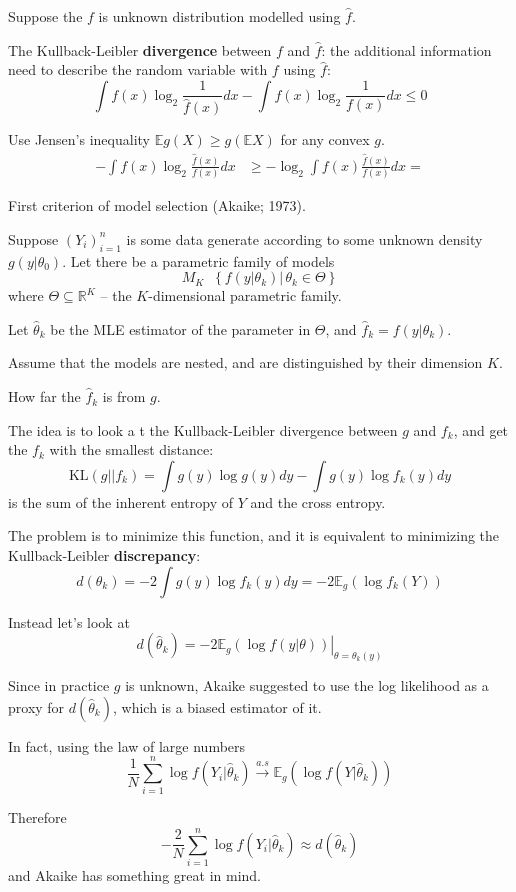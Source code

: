 \documentclass[a4paper]{article}
\newcommand{\obj}[1]{{\left\{ #1 \right \}}}
\newcommand{\brac}[1]{{\left ( #1 \right )}}
\newcommand{\induc}[1]{{\left . #1 \right \vert}}
\newcommand{\Real}{\mathbb{R}}
\newcommand{\Ex}[0]{{\mathbb{E}}}
\newcommand{\defn}{\mathop{\overset{\Delta}{=}}\nolimits}
\begin{document}
Suppose the $f$ is unknown distribution modelled using $\hat{f}$.

The Kullback-Leibler \textbf{divergence} between $f$ and $\hat{f}$: the additional information need to describe the random variable with $f$ using $\hat{f}$: \[\int f(x) \log_2\frac{1}{\hat{f}(x)} dx - \int f(x) \log_2\frac{1}{f(x)} dx \leq 0 \]

Use Jensen's inequality $\Ex g(X) \geq g\brac{\Ex X}$ for any convex $g$.
\begin{align*}
	-\int f(x) \log_2\frac{\hat{f}(x)}{f(x)} dx & \geq -\log_2\int f(x) \frac{\hat{f}(x)}{f(x)}  dx = 
\end{align*}

First criterion of model selection (Akaike; 1973).

Suppose $\brac{Y_i}_{i=1}^n$ is some data generate according to some unknown density $g\brac{\induc{y}\theta_0}$. Let there be a parametric family of models
\[M_K \defn \obj{\induc{f\brac{\induc{y}\theta_k}}\,\theta_k\in \Theta}\]
where $\Theta\subseteq \Real^K$ -- the $K$-dimensional parametric family.

Let $\hat{\theta}_k$ be the MLE estimator of the parameter in $\Theta$, and $\hat{f}_k = f\brac{\induc{y}\theta_k}$.

Assume that the models are nested, and are distinguished by their dimension $K$.

How far the $\hat{f}_k$ is from $g$.

The idea is to look a t the Kullback-Leibler divergence between $g$ and $f_k$, and get the $f_k$ with the smallest distance:
\[\text{KL}(g||f_k) = \int g(y) \log g(y) dy - \int g(y) \log f_k(y) dy\]
is the sum of the inherent entropy of $Y$ and the cross entropy.

The problem is to minimize this function, and it is equivalent to minimizing the Kullback-Leibler \textbf{discrepancy}:
\[d(\theta_k) = -2\int g(y) \log f_k(y) dy = - 2 \Ex_g\brac{\log f_k(Y)}\]

Instead	let's look at
\[d(\hat{\theta}_k) = - 2\induc{\Ex_g\brac{\log f(\induc{y}\theta)}}_{\theta=\theta_k(y)} \]

Since in practice $g$ is unknown, Akaike suggested to use the log likelihood as a proxy for $d(\hat{\theta}_k)$, which is a biased estimator of it.

In fact, using the law of large numbers
\[\frac{1}{N} \sum_{i=1}^n \log f(Y_i|\hat{\theta}_k) \overset{a.s}{\to} \Ex_g\brac{\log f(\induc{Y}\hat{\theta}_k)}\]

Therefore
\[-\frac{2}{N} \sum_{i=1}^n \log f(Y_i|\hat{\theta}_k) \approx d(\hat{\theta}_k)\] and Akaike has something great in mind.
\end{document}
